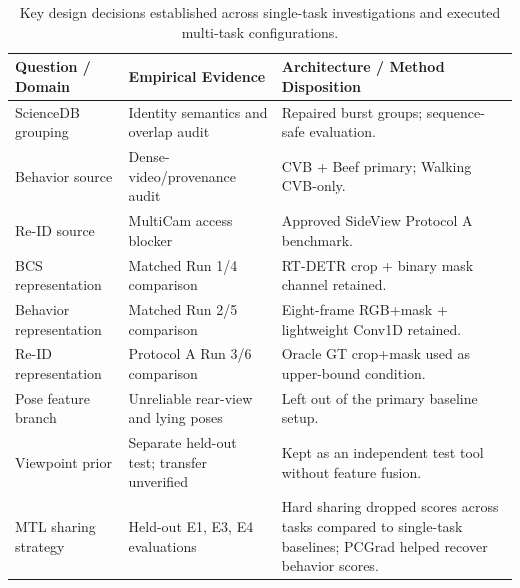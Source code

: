 \begin{table}[htbp]
\centering\small
\caption[Evidence-led design decisions across single-task and multi-task investigations]{Key design decisions established across single-task investigations and executed multi-task configurations.}\label{tab:decisions}
\begin{tabularx}{\textwidth}{lYY}
\toprule
\textbf{Question / Domain} & \textbf{Empirical Evidence} & \textbf{Architecture / Method Disposition} \\
\midrule
ScienceDB grouping & Identity semantics and overlap audit & Repaired burst groups; sequence-safe evaluation. \\
Behavior source & Dense-video/provenance audit & CVB + Beef primary; Walking CVB-only. \\
Re-ID source & MultiCam access blocker & Approved SideView Protocol A benchmark. \\
BCS representation & Matched Run 1/4 comparison & RT-DETR crop + binary mask channel retained. \\
Behavior representation & Matched Run 2/5 comparison & Eight-frame RGB+mask + lightweight Conv1D retained. \\
Re-ID representation & Protocol A Run 3/6 comparison & Oracle GT crop+mask used as upper-bound condition. \\
Pose feature branch & Unreliable rear-view and lying poses & Left out of the primary baseline setup. \\
Viewpoint prior & Separate held-out test; transfer unverified & Kept as an independent test tool without feature fusion. \\
MTL sharing strategy & Held-out E1, E3, E4 evaluations & Hard sharing dropped scores across tasks compared to single-task baselines; PCGrad helped recover behavior scores. \\
\bottomrule
\end{tabularx}
\end{table}

